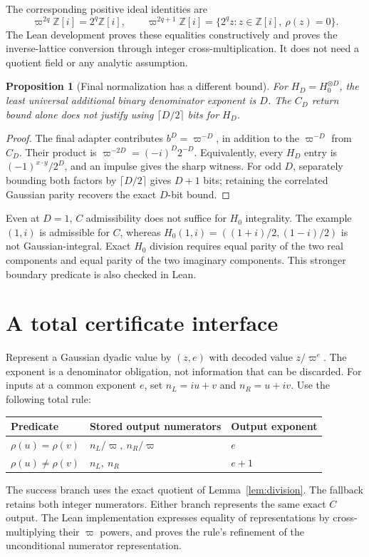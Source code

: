 \documentclass[11pt]{article}
\newtheorem{proposition}[theorem]{Proposition}
\theoremstyle{definition}\newtheorem{definition}[theorem]{Definition}
\theoremstyle{remark}\newtheorem{remark}[theorem]{Remark}
\newcommand{\G}{\mathbb Z[i]}
\newcommand{\p}{\varpi}
\newcommand{\res}{\rho}
\begin{document}
The corresponding positive ideal identities are
\begin{equation}\label{eq:ideals}
 \p^{2q}\G=2^q\G,\qquad
 \p^{2q+1}\G=\{2^qz:z\in\G,\ \res(z)=0\}.
\end{equation}
The Lean development proves these equalities constructively and proves the inverse-lattice conversion through integer cross-multiplication. It does not need a quotient field or any analytic assumption.

\begin{proposition}[Final normalization has a different bound]\label{prop:final}
For $H_D=H_0^{\otimes D}$, the least universal additional binary denominator exponent is $D$. The $C_D$ return bound alone does not justify using $\lceil D/2\rceil$ bits for $H_D$.
\end{proposition}
\begin{proof}
The final adapter contributes $b^D=\p^{-D}$, in addition to the $\p^{-D}$ from $C_D$. Their product is $\p^{-2D}=(-i)^D2^{-D}$. Equivalently, every $H_D$ entry is $(-1)^{x\cdot y}/2^D$, and an impulse gives the sharp witness. For odd $D$, separately bounding both factors by $\lceil D/2\rceil$ gives $D+1$ bits; retaining the correlated Gaussian parity recovers the exact $D$-bit bound.
\end{proof}

Even at $D=1$, $C$ admissibility does not suffice for $H_0$ integrality. The example $(1,i)$ is admissible for $C$, whereas $H_0(1,i)=((1+i)/2,(1-i)/2)$ is not Gaussian-integral. Exact $H_0$ division requires equal parity of the two real components and equal parity of the two imaginary components. This stronger boundary predicate is also checked in Lean.

\section{A total certificate interface}
Represent a Gaussian dyadic value by $(z,e)$ with decoded value $z/\p^e$. The exponent is a denominator obligation, not information that can be discarded. For inputs at a common exponent $e$, set $n_L=iu+v$ and $n_R=u+iv$. Use the following total rule:
\begin{center}
\begin{tabular}{@{}lll@{}}
\toprule
Predicate & Stored output numerators & Output exponent\\
\midrule
$\res(u)=\res(v)$ & $n_L/\p,\ n_R/\p$ & $e$\\
$\res(u)\ne\res(v)$ & $n_L,\ n_R$ & $e+1$\\
\bottomrule
\end{tabular}
\end{center}
The success branch uses the exact quotient of Lemma~\ref{lem:division}. The fallback retains both integer numerators. Either branch represents the same exact $C$ output. The Lean implementation expresses equality of representations by cross-multiplying their $\p$ powers, and proves the rule's refinement of the unconditional numerator representation.
\end{document}

